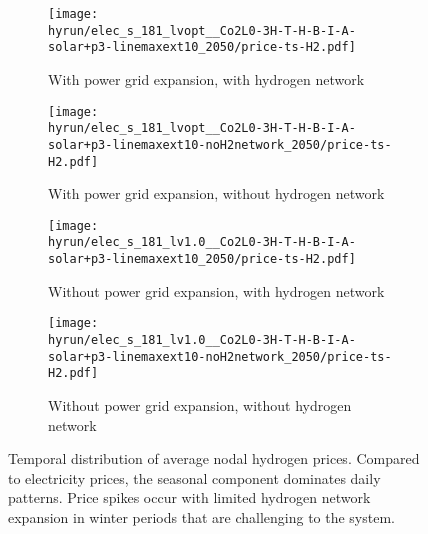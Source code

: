 \begin{figure}
    \begin{subfigure}{0.49\textwidth}
        \centering
        \caption{With power grid expansion, with hydrogen network}
        \texttt{[image: \\hyrun/elec\_s\_181\_lvopt\_\_Co2L0-3H-T-H-B-I-A-solar+p3-linemaxext10\_2050/price-ts-H2.pdf]}
    \end{subfigure}
    \begin{subfigure}{0.49\textwidth}
        \centering
        \caption{With power grid expansion, without hydrogen network}
        \texttt{[image: \\hyrun/elec\_s\_181\_lvopt\_\_Co2L0-3H-T-H-B-I-A-solar+p3-linemaxext10-noH2network\_2050/price-ts-H2.pdf]}
    \end{subfigure}
    \begin{subfigure}{0.49\textwidth}
        \centering
        \caption{Without power grid expansion, with hydrogen network}
        \texttt{[image: \\hyrun/elec\_s\_181\_lv1.0\_\_Co2L0-3H-T-H-B-I-A-solar+p3-linemaxext10\_2050/price-ts-H2.pdf]}
    \end{subfigure}
    \begin{subfigure}{0.49\textwidth}
        \centering
        \caption{Without power grid expansion, without hydrogen network}
        \texttt{[image: \\hyrun/elec\_s\_181\_lv1.0\_\_Co2L0-3H-T-H-B-I-A-solar+p3-linemaxext10-noH2network\_2050/price-ts-H2.pdf]}
    \end{subfigure}
    \caption{Temporal distribution of average nodal hydrogen prices. Compared to
    electricity prices, the seasonal component dominates daily patterns. Price
    spikes occur with limited hydrogen network expansion in winter periods that
    are challenging to the system.}
    \label{fig:si:lmp-ts-h2}
\end{figure}

